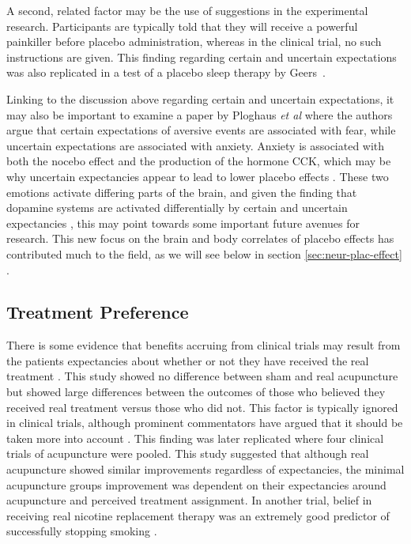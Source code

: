 A second, related factor may be the use of suggestions in the experimental research. Participants are typically told that they will receive a powerful painkiller before placebo administration, whereas in the clinical trial, no such instructions are given. This finding regarding certain and uncertain expectations was also replicated in a test of a placebo sleep therapy by Geers~\cite{Geers2005a}.

Linking to the discussion above regarding certain and uncertain expectations, it may also be important to examine a paper by Ploghaus {\it et al\/} \cite{Ploghaus2003} where the authors argue that certain expectations of aversive events are associated with fear, while uncertain expectations are associated with anxiety. Anxiety is associated with both the nocebo effect and the production of the hormone CCK, which may be why uncertain expectancies appear to lead to lower placebo effects \cite{Colloca2008b}. These two emotions activate differing parts of the brain, and given the finding that dopamine systems are activated differentially by certain and uncertain expectancies \cite{Scott2007a}, this may point towards some important future avenues for research. This new focus on the brain and body correlates of placebo effects has contributed much to the field, as we will see below in section \ref{sec:neur-plac-effect} .

\subsection{Treatment Preference}
\label{sec:treatment-preference}


There is some evidence that benefits accruing from clinical trials may result from the patients expectancies about whether or not they have received the real treatment \cite{Bausell2005}. This study showed no difference between sham and real acupuncture but showed large differences between the outcomes of those who believed they received real treatment versus those who did not. This factor is typically ignored in clinical trials, although prominent commentators have argued that it should be taken more into account \cite{Benedetti2007}. This finding was later replicated \cite{Linde2007}  where four clinical trials of acupuncture were pooled. This study suggested that although real acupuncture showed similar improvements regardless of expectancies, the minimal acupuncture groups improvement was dependent on their expectancies around acupuncture and perceived treatment assignment. In another trial, belief in receiving real nicotine replacement therapy was an extremely good predictor of successfully stopping smoking \cite{Benedetti2008}. 

